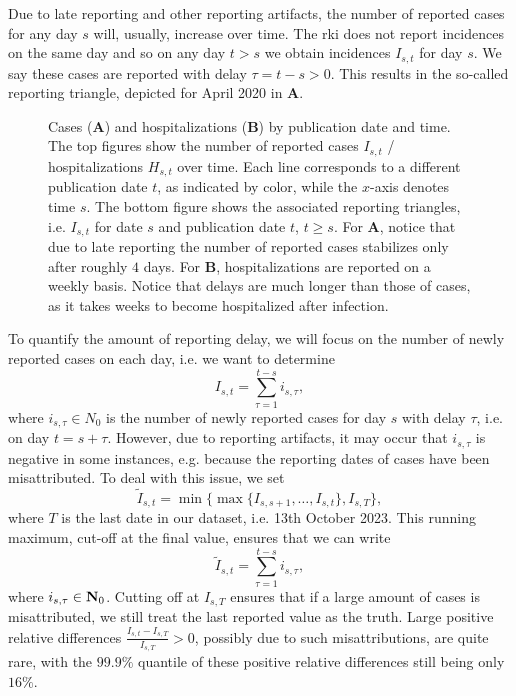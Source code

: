 Due to late reporting and other reporting artifacts, the number of reported cases for any day $s$ will, usually, increase over time. The \gls{rki} does not report incidences on the same day and so on any day $t > s$ we obtain incidences $I_{s,t}$ for day $s$. We say these cases are reported with delay $\tau = t -s > 0$. This results in the so-called reporting triangle, depicted for April 2020 in  \textbf{A}. 

\begin{figure}
    \resizebox{\textwidth}{!}{%
    }
    \caption{Cases (\textbf{A}) and hospitalizations (\textbf{B}) by publication date and time. The top figures show the number of reported cases $I_{s,t}$ / hospitalizations $H_{s,t}$ over time. Each line corresponds to a different publication date $t$, as indicated by color, while the $x$-axis denotes time $s$. The bottom figure shows the associated reporting triangles, i.e. $I_{s,t}$ for date $s$ and publication date $t$, $t \geq s$.
    For \textbf{A}, notice that due to late reporting the number of reported cases stabilizes only after roughly $4$ days.
    For \textbf{B}, hospitalizations are reported on a weekly basis. Notice that delays are much longer than those of cases, as it takes weeks to become hospitalized after infection.}
    \label{fig:reporting_delays_cases}
\end{figure}

To quantify the amount of reporting delay, we will focus on the number of newly reported cases on each day, i.e. we want to determine
$$
    I_{s,t} = \sum_{\tau = 1}^{t - s} i_{s,\tau},
$$
where $i_{s,\tau} \in N_{0}$ is the number of newly reported cases for day $s$ with delay $\tau$, i.e. on day $t = s + \tau$. However, due to reporting artifacts, it may occur that $i_{s,\tau}$ is negative in some instances, e.g. because the reporting dates of cases have been misattributed. To deal with this issue, we set 
$$
    \tilde I_{s,t} = \min \{\max \{I_{s,s + 1}, \dots, I_{s, t}\}, I_{s, T}\},
$$
where $T$ is the last date in our dataset, i.e. 13th October 2023. This running maximum, cut-off at the final value, ensures that we can write 
$$
    \tilde I_{s,t} =  \sum_{\tau = 1}^{t - s} i_{s,\tau},
$$
where $i_{s,\tau} \in \mathbf N_0$. Cutting off at $I_{s,T}$ ensures that if a large amount of cases is misattributed, we still treat the last reported value as the truth. Large positive relative differences $ \frac{I_{s, t} - I_{s,T}}{I_{s,T}} > 0$, possibly due to such misattributions, are quite rare, with the $99.9\%$ quantile of these positive relative differences still being only $16\%$.

